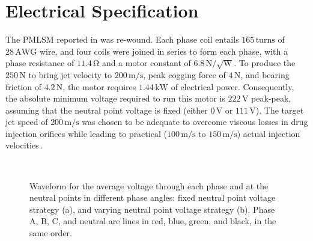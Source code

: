 \section{Electrical Specification}
    The PMLSM reported in \cite{Do2017} was re-wound. Each phase coil entails $165\,\mathrm{turns}$ of $28\,\mathrm{AWG}$ wire, and four coils were joined in series to form each phase, with a phase resistance of $11.4\,\mathrm{\Omega}$ and a motor constant of $6.8\,\mathrm{N/\sqrt{W}}$. To produce the $250\,\mathrm{N}$ to bring jet velocity to $200\,\mathrm{m/s}$, peak cogging force of $4\,\mathrm{N}$, and bearing friction of $4.2\,\mathrm{N}$, the motor requires $1.44\,\mathrm{kW}$ of electrical power. Consequently, the absolute minimum  voltage required to run this motor is $222\,\mathrm{V}$ peak-peak, assuming that the neutral point voltage is fixed (either $0\,\mathrm{V}$ or $111\,\mathrm{V}$). The target jet speed of $200\,\mathrm{m/s}$ was chosen to be adequate to overcome viscous losses in drug injection orifices while leading to practical ($100\,\mathrm{m/s}$ to $150\,\mathrm{m/s}$) actual injection velocities\,\cite{mitragotri2006}. 
    
    
    
    \begin{figure}
    \centering
        \\
    \caption{Waveform for the average voltage through each phase and at the neutral points in different phase angles: fixed neutral point voltage strategy (a), and varying neutral point voltage strategy (b). Phase A, B, C, and neutral are lines in red, blue, green, and black, in the same order.}
    \end{figure}
    

